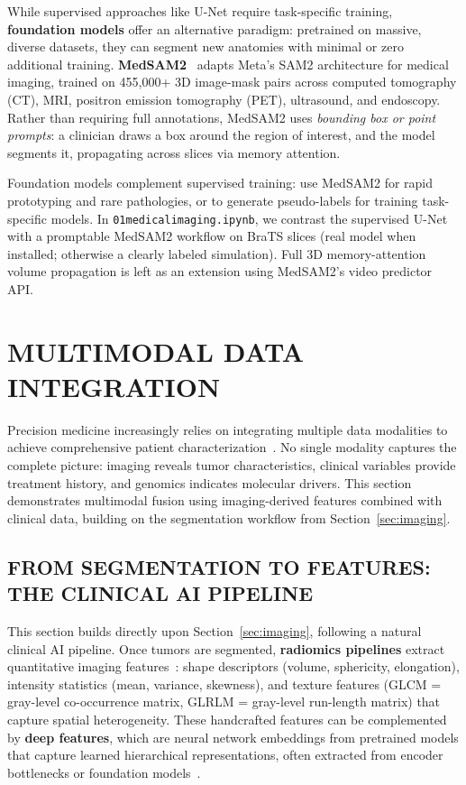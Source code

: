 \documentclass[krantz2,ChapterTOCs]{krantz}
\newcommand{\notebook}[1]{\texttt{\def\_{\textunderscore\allowbreak}#1}}
\begin{document}
While supervised approaches like U-Net require task-specific training, \textbf{foundation models} offer an alternative paradigm: pretrained on massive, diverse datasets, they can segment new anatomies with minimal or zero additional training.
\textbf{MedSAM2}~\citep{ma2025medsam2} adapts Meta's SAM2 architecture for medical imaging, trained on 455,000+ 3D image-mask pairs across computed tomography (CT), MRI, positron emission tomography (PET), ultrasound, and endoscopy.
Rather than requiring full annotations, MedSAM2 uses \emph{bounding box or point prompts}: a clinician draws a box around the region of interest, and the model segments it, propagating across slices via memory attention.

Foundation models complement supervised training: use MedSAM2 for rapid prototyping and rare pathologies, or to generate pseudo-labels for training task-specific models.
In \notebook{01\_medical\_imaging.ipynb}, we contrast the supervised U-Net with a promptable MedSAM2 workflow on BraTS slices (real model when installed; otherwise a clearly labeled simulation). Full 3D memory-attention volume propagation is left as an extension using MedSAM2's video predictor API.

\section{MULTIMODAL DATA INTEGRATION}
\label{sec:multimodal}

Precision medicine increasingly relies on integrating multiple data modalities to achieve comprehensive patient characterization~\citep{acosta2022multimodal, huang2020fusion}. 
No single modality captures the complete picture: imaging reveals tumor characteristics, clinical variables provide treatment history, and genomics indicates molecular drivers. 
This section demonstrates multimodal fusion using imaging-derived features combined with clinical data, building on the segmentation workflow from Section~\ref{sec:imaging}.

\subsection{FROM SEGMENTATION TO FEATURES: THE CLINICAL AI PIPELINE}

This section builds directly upon Section~\ref{sec:imaging}, following a natural clinical AI pipeline. Once tumors are segmented, \textbf{radiomics pipelines} extract quantitative imaging features~\citep{aerts2014decoding}: shape descriptors (volume, sphericity, elongation), intensity statistics (mean, variance, skewness), and texture features (GLCM = gray-level co-occurrence matrix, GLRLM = gray-level run-length matrix) that capture spatial heterogeneity. These handcrafted features can be complemented by \textbf{deep features}, which are neural network embeddings from pretrained models that capture learned hierarchical representations, often extracted from encoder bottlenecks or foundation models~\citep{moor2023foundation}.
\end{document}
